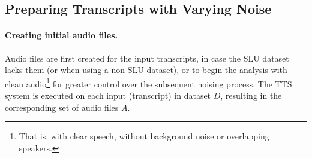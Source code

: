 


\subsection{Preparing Transcripts with Varying Noise}
\label{sec_framework_noise}

\paragraph{Creating initial audio files.}
Audio files are first created for the input transcripts, in case the SLU dataset lacks them (or when using a non-SLU dataset), or to begin the analysis with clean audio\footnote{That is, with clear speech, without background noise or overlapping speakers.} for greater control over the subsequent noising process.
The TTS system is executed on each input (transcript) in dataset $D$, resulting in the corresponding set of audio files $A$.

